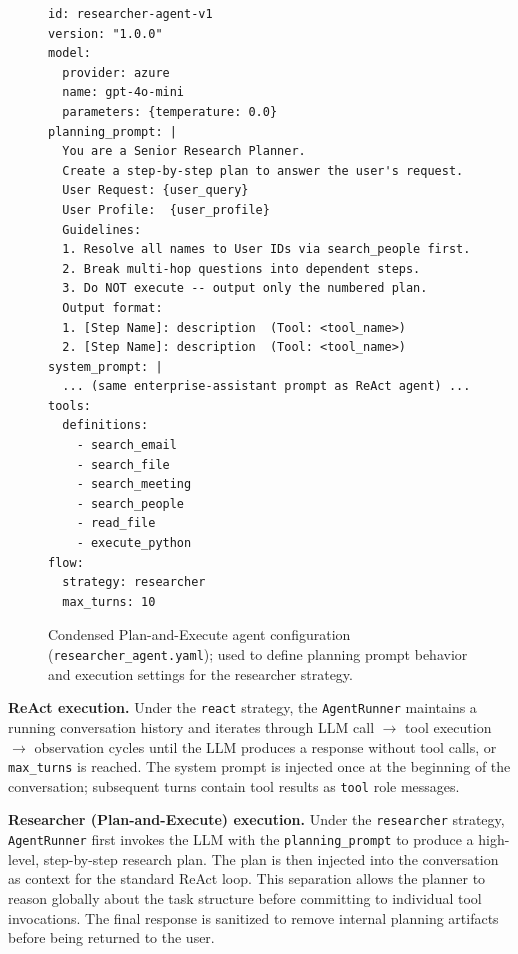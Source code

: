 \documentclass[journal,dvipsnames]{acmart}
\begin{document}
\begin{figure}[h]
  \centering
  
\begin{minipage}{0.9\textwidth}
\begin{lstlisting}
id: researcher-agent-v1
version: "1.0.0"
model:
  provider: azure
  name: gpt-4o-mini
  parameters: {temperature: 0.0}
planning_prompt: |
  You are a Senior Research Planner.
  Create a step-by-step plan to answer the user's request.
  User Request: {user_query}
  User Profile:  {user_profile}
  Guidelines:
  1. Resolve all names to User IDs via search_people first.
  2. Break multi-hop questions into dependent steps.
  3. Do NOT execute -- output only the numbered plan.
  Output format:
  1. [Step Name]: description  (Tool: <tool_name>)
  2. [Step Name]: description  (Tool: <tool_name>)
system_prompt: |
  ... (same enterprise-assistant prompt as ReAct agent) ...
tools:
  definitions:
    - search_email
    - search_file
    - search_meeting
    - search_people
    - read_file
    - execute_python
flow:
  strategy: researcher
  max_turns: 10
  \end{lstlisting}
\end{minipage}

  \caption{Condensed Plan-and-Execute agent configuration (\texttt{researcher\_agent.yaml}); used to define planning prompt behavior and execution settings for the researcher strategy.}
  \label{lst:researcher_agent}
\end{figure}

\textbf{ReAct execution.}
Under the \texttt{react} strategy, the \texttt{AgentRunner} maintains a running
conversation history and iterates through LLM call $\to$ tool execution $\to$
observation cycles until the LLM produces a response without tool calls, or
\texttt{max\_turns} is reached.  The system prompt is injected once at the
beginning of the conversation; subsequent turns contain tool results as
\texttt{tool} role messages.

\textbf{Researcher (Plan-and-Execute) execution.}
Under the \texttt{researcher} strategy, \texttt{AgentRunner} first invokes the
LLM with the \texttt{planning\_prompt} to produce a high-level, step-by-step
research plan.  The plan is then injected into the conversation as context for
the standard ReAct loop.  This separation allows the planner to reason globally
about the task structure before committing to individual tool invocations.  The
final response is sanitized to remove internal planning artifacts before being
returned to the user.
\end{document}
